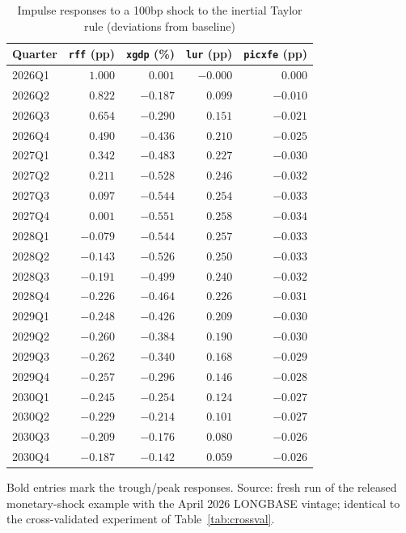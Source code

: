 \begin{table}[htbp]
\centering
\caption{Impulse responses to a 100bp shock to the inertial Taylor rule (deviations from baseline)}
\label{tab:irf}
\small
\begin{tabular}{lrrrr}
\toprule
Quarter & \texttt{rff} (pp) & \texttt{xgdp} (\%) & \texttt{lur} (pp) & \texttt{picxfe} (pp) \\
\midrule
2026Q1 & $1.000$  & $0.001$  & $-0.000$ & $0.000$ \\
2026Q2 & $0.822$  & $-0.187$ & $0.099$  & $-0.010$ \\
2026Q3 & $0.654$  & $-0.290$ & $0.151$  & $-0.021$ \\
2026Q4 & $0.490$  & $-0.436$ & $0.210$  & $-0.025$ \\
2027Q1 & $0.342$  & $-0.483$ & $0.227$  & $-0.030$ \\
2027Q2 & $0.211$  & $-0.528$ & $0.246$  & $-0.032$ \\
2027Q3 & $0.097$  & $-0.544$ & $0.254$  & $-0.033$ \\
2027Q4 & $0.001$  & $\mathbf{-0.551}$ & $\mathbf{0.258}$ & $\mathbf{-0.034}$ \\
2028Q1 & $-0.079$ & $-0.544$ & $0.257$  & $-0.033$ \\
2028Q2 & $-0.143$ & $-0.526$ & $0.250$  & $-0.033$ \\
2028Q3 & $-0.191$ & $-0.499$ & $0.240$  & $-0.032$ \\
2028Q4 & $-0.226$ & $-0.464$ & $0.226$  & $-0.031$ \\
2029Q1 & $-0.248$ & $-0.426$ & $0.209$  & $-0.030$ \\
2029Q2 & $-0.260$ & $-0.384$ & $0.190$  & $-0.030$ \\
2029Q3 & $-0.262$ & $-0.340$ & $0.168$  & $-0.029$ \\
2029Q4 & $-0.257$ & $-0.296$ & $0.146$  & $-0.028$ \\
2030Q1 & $-0.245$ & $-0.254$ & $0.124$  & $-0.027$ \\
2030Q2 & $-0.229$ & $-0.214$ & $0.101$  & $-0.027$ \\
2030Q3 & $-0.209$ & $-0.176$ & $0.080$  & $-0.026$ \\
2030Q4 & $-0.187$ & $-0.142$ & $0.059$  & $-0.026$ \\
\bottomrule
\end{tabular}

\medskip
\parbox{0.92\textwidth}{\footnotesize Bold entries mark the trough/peak responses. Source: fresh run of the released monetary-shock example with the April 2026 LONGBASE vintage; identical to the cross-validated experiment of Table~\ref{tab:crossval}.}
\end{table}

